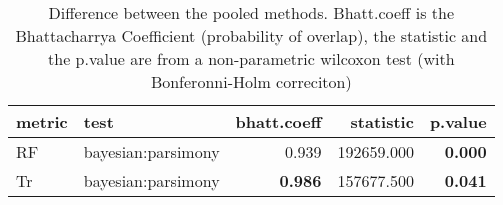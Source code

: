 \begin{table}[ht]
\centering
\begin{tabular}{llr|rr}
  \hline
metric & test & bhatt.coeff & statistic & p.value \\ 
  \hline
RF & bayesian:parsimony & 0.939 & 192659.000 & \textbf{0.000} \\ 
  Tr & bayesian:parsimony & \textbf{0.986} & 157677.500 & \textbf{0.041} \\ 
   \hline
\end{tabular}
\caption{Difference between the pooled methods. Bhatt.coeff is the Bhattacharrya Coefficient (probability of overlap), the statistic and the p.value are from a non-parametric wilcoxon test (with Bonferonni-Holm correciton)} 
\label{Tab_pooledsmethods_test}
\end{table}
